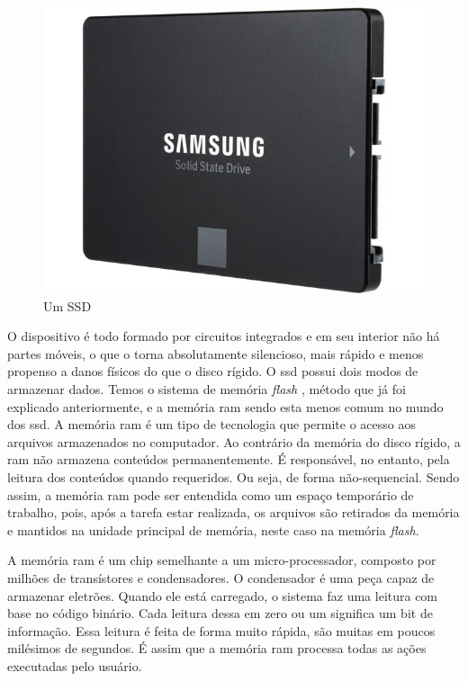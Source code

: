 \documentclass{report}
\begin{document}
	\begin{figure} [h]
		\centering
		\includegraphics[scale=0.25]{ssd.jpg}
		\caption{Um SSD}
	\end{figure}
	
\vspace{5mm}	
	
	O dispositivo é todo formado por circuitos integrados e em seu interior não há partes móveis, o que o torna absolutamente silencioso, mais rápido e menos propenso a danos físicos do que o disco rígido.
\vspace{1mm}
	O \ac{ssd} possui dois modos de armazenar dados. Temos o sistema de memória \textit{flash}  , método que já foi explicado anteriormente, e a memória \ac{ram} sendo esta menos comum no mundo dos \ac{ssd}. A memória \ac{ram} é um tipo de tecnologia que permite o acesso aos arquivos armazenados no computador. Ao contrário da memória do disco rígido, a \ac{ram} não armazena conteúdos permanentemente. É responsável, no entanto, pela leitura dos conteúdos quando requeridos. Ou seja, de forma não-sequencial. Sendo assim, a memória \ac{ram} pode ser entendida como um espaço temporário de trabalho, pois, após a tarefa estar realizada, os arquivos são retirados da memória e mantidos na unidade principal de memória, neste caso na memória \textit{flash}.
\vspace{1mm}
	
\newpage	
	
	A memória \ac{ram} é um chip semelhante a um micro-processador, composto por milhões de transístores e condensadores. O condensador é uma peça capaz de armazenar eletrões. Quando ele está carregado, o sistema faz uma leitura com base no código binário. Cada leitura dessa em zero ou um significa um bit de informação. Essa leitura é feita de forma muito rápida, são muitas em poucos milésimos de segundos. É assim que a memória \ac{ram} processa todas as ações executadas pelo usuário.
\vspace{20mm}
\end{document}
